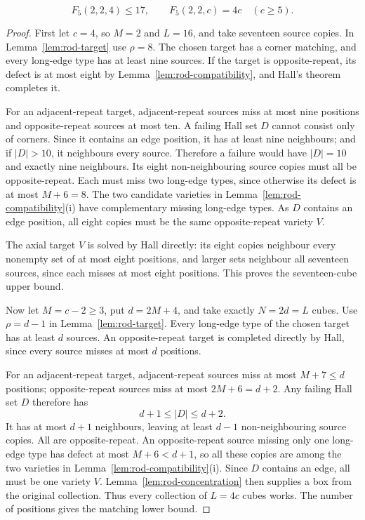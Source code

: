 \begin{theorem}\label{thm:sharp-rods-upper}
\[
 F_5(2,2,4)\le17,
 \qquad
 F_5(2,2,c)=4c\quad(c\ge5).
\]
\end{theorem}

\begin{proof}
First let $c=4$, so $M=2$ and $L=16$, and take seventeen source
copies. In Lemma~\ref{lem:rod-target} use $\rho=8$. The chosen target has
a corner matching, and every long-edge type has at least nine sources.
If the target is opposite-repeat, its defect is at most eight by
Lemma~\ref{lem:rod-compatibility}, and Hall's theorem completes it.

For an adjacent-repeat target, adjacent-repeat sources miss at most nine
positions and opposite-repeat sources at most ten. A failing Hall set
$D$ cannot consist only of corners. Since it contains an edge position,
it has at least nine neighbours; and if $|D|>10$, it neighbours every
source. Therefore a failure would have $|D|=10$ and exactly nine
neighbours. Its eight non-neighbouring source copies must all be
opposite-repeat. Each must miss two long-edge types, since otherwise
its defect is at most $M+6=8$. The two candidate varieties in
Lemma~\ref{lem:rod-compatibility}(i) have complementary missing
long-edge types. As $D$ contains an edge position, all eight copies
must be the same opposite-repeat variety $V$.

The axial target $V$ is solved by Hall directly: its eight copies
neighbour every nonempty set of at most eight positions, and larger
sets neighbour all seventeen sources, since each misses at most eight
positions. This proves the seventeen-cube upper bound.

Now let $M=c-2\ge3$, put $d=2M+4$, and take exactly $N=2d=L$
cubes. Use $\rho=d-1$ in Lemma~\ref{lem:rod-target}. Every long-edge type
of the chosen target has at least $d$ sources. An opposite-repeat
target is completed directly by Hall, since every source misses at
most $d$ positions.

For an adjacent-repeat target, adjacent-repeat sources miss at most
$M+7\le d$ positions; opposite-repeat sources miss at most
$2M+6=d+2$. Any failing Hall set $D$ therefore has
\[
 d+1\le |D|\le d+2.
\]
It has at most $d+1$ neighbours, leaving at least $d-1$ non-neighbouring
source copies. All are opposite-repeat. An opposite-repeat source
missing only one long-edge type has defect at most $M+6<d+1$, so
all these copies are among the two varieties in
Lemma~\ref{lem:rod-compatibility}(i). Since $D$ contains an edge,
all must be one variety $V$. Lemma~\ref{lem:rod-concentration} then
supplies a box from the original collection. Thus every collection of
$L=4c$ cubes works. The number of positions gives the matching lower
bound.
\end{proof}

